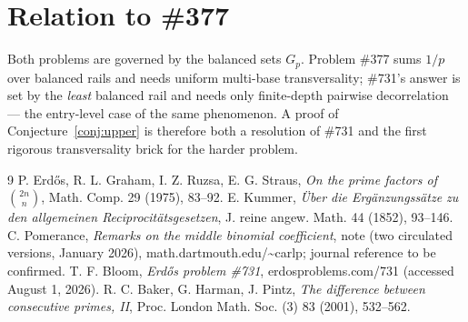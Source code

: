 \documentclass[11pt]{article}
\begin{document}
\section{Relation to \#377}

Both problems are governed by the balanced sets $G_p$.  Problem \#377 sums
$1/p$ over balanced rails and needs uniform multi-base transversality;
\#731's answer is set by the \emph{least} balanced rail and needs only
finite-depth pairwise decorrelation --- the entry-level case of the same
phenomenon.  A proof of Conjecture~\ref{conj:upper} is therefore both a
resolution of \#731 and the first rigorous transversality brick for the
harder problem.

\begin{thebibliography}{9}
 P. Erd\H{o}s, R. L. Graham, I. Z. Ruzsa, E. G. Straus,
\emph{On the prime factors of $\binom{2n}{n}$}, Math. Comp. 29 (1975),
83--92.
 E. Kummer, \emph{\"Uber die Erg\"anzungss\"atze zu den
allgemeinen Reciprocit\"atsgesetzen}, J. reine angew. Math. 44 (1852),
93--146.
 C. Pomerance, \emph{Remarks on the middle binomial
coefficient}, note (two circulated versions, January 2026),
math.dartmouth.edu/\textasciitilde carlp; journal reference to be confirmed.
 T. F. Bloom, \emph{Erd\H{o}s problem \#731},
erdosproblems.com/731 (accessed August 1, 2026).
 R. C. Baker, G. Harman, J. Pintz, \emph{The difference between
consecutive primes, II}, Proc. London Math. Soc. (3) 83 (2001), 532--562.
\end{thebibliography}
\end{document}

